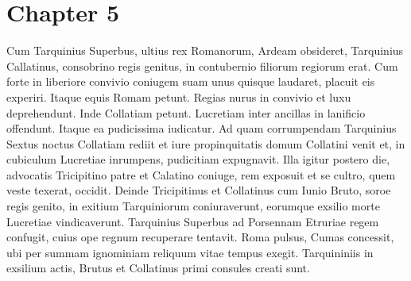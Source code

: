 \chapter*{Chapter 5} %
\label{sec:chapter_5}

Cum Tarquinius Superbus, ultius rex Romanorum, Ardeam 
obsideret, Tarquinius Callatinus, consobrino regis genitus, in contubernio
filiorum regiorum erat.  Cum forte in liberiore convivio
coniugem suam unus quisque laudaret, placuit eis experiri.  Itaque
equis Romam petunt.  Regias nurus in convivio et luxu deprehendunt.
Inde Collatiam petunt.  Lucretiam inter ancillas in lanificio offendunt.
Itaque ea pudicissima iudicatur.  Ad quam corrumpendam Tarquinius
Sextus noctus Collatiam rediit et iure propinquitatis domum Collatini
venit et, in cubiculum Lucretiae inrumpens, pudicitiam expugnavit.  
Illa igitur postero die, advocatis Tricipitino patre et Calatino
coniuge, rem exposuit et se cultro, quem veste texerat, occidit.
Deinde Tricipitinus et Collatinus cum Iunio Bruto, soroe regis
genito, in exitium Tarquiniorum coniuraverunt, eorumque exsilio
morte Lucretiae vindicaverunt.  Tarquinius Superbus ad Porsennam
Etruriae regem confugit, cuius ope regnum recuperare tentavit.
Roma pulsus, Cumas concessit, ubi per summam ignominiam
reliquum vitae tempus exegit.  Tarquininiis in exsilium actis, Brutus et
Collatinus primi consules creati sunt.



